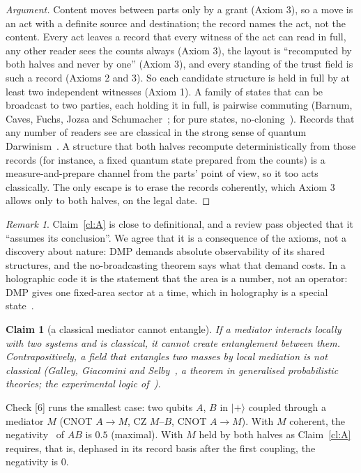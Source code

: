 \documentclass[11pt,a4paper]{article}
\newtheorem{claim}{Claim}
\theoremstyle{definition}
\theoremstyle{remark}
\newtheorem{remark}{Remark}
\newcommand{\chk}[1]{\textsf{[#1]}}
\begin{document}
\begin{proof}[Argument]
Content moves between parts only by a grant (Axiom 3), so a move is an act with a definite source and destination; the record names the
act, not the content. Every act leaves a record that every witness of the act can read in full, any other reader sees the counts always
(Axiom 3), the layout is ``recomputed by both halves and never by one'' (Axiom 3), and every standing of the trust field is such a record
(Axioms 2 and 3). So each candidate structure is held in full by at least two independent witnesses (Axiom 1). A family of states that can be
broadcast to two parties, each holding it in full, is pairwise commuting (Barnum, Caves, Fuchs, Jozsa and Schumacher~\cite{barnum}; for
pure states, no-cloning~\cite{wz,dieks}). Records that any number of readers see are classical in the strong sense of quantum
Darwinism~\cite{bph}. A structure that both halves recompute deterministically from those records (for instance, a fixed quantum state
prepared from the counts) is a measure-and-prepare channel from the parts' point of view, so it too acts classically. The only escape is
to erase the records coherently, which Axiom 3 allows only to both halves, on the legal date.
\end{proof}

\begin{remark}
Claim~\ref{cl:A} is close to definitional, and a review pass objected that it ``assumes its conclusion''. We agree that it is a
consequence of the axioms, not a discovery about nature: DMP demands absolute observability of its shared structures, and the
no-broadcasting theorem says what that demand costs. In a holographic code it is the statement that the area is a number, not an
operator: DMP gives one fixed-area sector at a time, which in holography is a special state~\cite{dhm}.
\end{remark}

\begin{claim}[a classical mediator cannot entangle]\label{cl:B}
If a mediator interacts locally with two systems and is classical, it cannot create entanglement between them. Contrapositively, a field
that entangles two masses by local mediation is not classical (Galley, Giacomini and Selby~\cite{ggs}, a theorem in generalised
probabilistic theories; the experimental logic of~\cite{bose,mv}).
\end{claim}

\noindent Check \chk{6} runs the smallest case: two qubits $A$, $B$ in $\lvert+\rangle$ coupled through a mediator $M$ (CNOT $A\to M$,
CZ $M$--$B$, CNOT $A\to M$). With $M$ coherent, the negativity~\cite{vw} of $AB$ is $0.5$ (maximal). With $M$ held by both halves as
Claim~\ref{cl:A} requires, that is, dephased in its record basis after the first coupling, the negativity is $0$.
\end{document}
